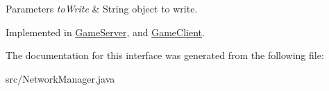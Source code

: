 \begin{DoxyParams}{Parameters}
{\em to\+Write} & String object to write. \\
\hline
\end{DoxyParams}


Implemented in \hyperlink{classGameServer_a7eb6fac8073558454fc9d4eb1ad78520}{Game\+Server}, and \hyperlink{classGameClient_a553f6df87097e02fd5b35e96e5005e7a}{Game\+Client}.



The documentation for this interface was generated from the following file\+:\begin{DoxyCompactItemize}
\item 
src/Network\+Manager.\+java\end{DoxyCompactItemize}
